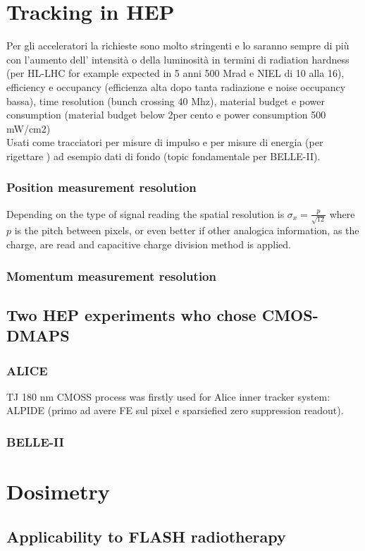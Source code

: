 \section{Tracking in HEP}
    Per gli acceleratori la richieste sono molto stringenti e lo saranno sempre di più con l'aumento dell' intensità o della luminosità in termini di radiation hardness (per HL-LHC for example expected in 5 anni 500 Mrad e NIEL di 10 alla 16), efficiency e occupancy (efficienza alta dopo tanta radiazione e noise occupancy bassa), time resolution (bunch crossing 40 Mhz), material budget e power consumption (material budget below 2per cento e power consumption 500 mW/cm2)\\
    Usati come tracciatori per misure di impulso e per misure di energia (per rigettare ) ad esempio dati di fondo (topic fondamentale per BELLE-II).

    \subsubsection{Position measurement resolution}
        Depending on the type of signal reading the spatial resolution is  $\sigma_x = \frac{p}{\sqrt{12}}$ where $p$ is the pitch between pixels, or even better if other 
        analogica information, as the charge, are read and capacitive charge division method is applied.
    \subsubsection{Momentum measurement resolution}

    \subsection{Two HEP experiments who chose CMOS-DMAPS}

        \subsubsection{ALICE}
            TJ 180 nm CMOSS process was firstly used for Alice inner tracker system: ALPIDE (primo ad avere FE sul pixel e sparsiefied zero suppression readout).
        \subsubsection{BELLE-II}

\section{Dosimetry}
    \subsection{Applicability to FLASH radiotherapy}